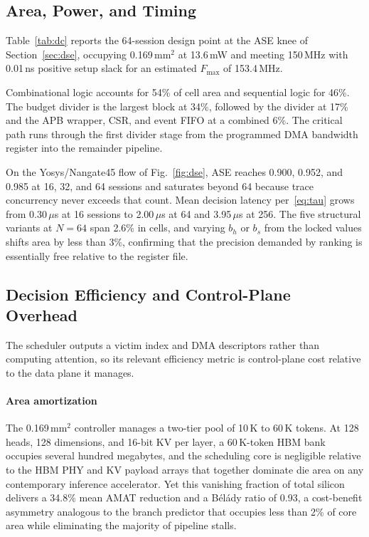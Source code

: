 \subsection{Area, Power, and Timing}
\label{sec:hw-ppa}

Table~\ref{tab:dc} reports the 64-session design point at the ASE knee
of Section~\ref{sec:dse}, occupying 0.169\,mm$^{2}$ at 13.6\,mW and
meeting 150\,MHz with 0.01\,ns positive setup slack for an estimated
$F_{\max}$ of 153.4\,MHz.



Combinational logic accounts for 54\% of cell area and sequential
logic for 46\%. The \tide budget divider is the largest block at 34\%,
followed by the \spear divider at 17\% and the APB wrapper, CSR, and
event FIFO at a combined 6\%. The critical path runs through the first
\tide divider stage from the programmed DMA bandwidth register into the
remainder pipeline.

On the Yosys/Nangate45 flow of Fig.~\ref{fig:dse}, ASE reaches 0.900,
0.952, and 0.985 at 16, 32, and 64 sessions and saturates beyond 64
because trace concurrency never exceeds that count. Mean decision
latency per~\eqref{eq:tau} grows from 0.30\,$\mu$s at 16 sessions to
2.00\,$\mu$s at 64 and 3.95\,$\mu$s at 256. The five structural
variants at $N{=}64$ span 2.6\% in cells, and varying $b_{h}$ or
$b_{s}$ from the locked values shifts area by less than 3\%,
confirming that the precision demanded by ranking is essentially free
relative to the register file.

\subsection{Decision Efficiency and Control-Plane Overhead}
\label{sec:hw-eff}

The scheduler outputs a victim index and DMA descriptors rather than
computing attention, so its relevant efficiency metric is control-plane
cost relative to the data plane it manages.

\paragraph{Area amortization}
The 0.169\,mm$^{2}$ controller manages a two-tier pool of 10\,K to
60\,K tokens. At 128 heads, 128 dimensions, and 16-bit KV per layer, a
60\,K-token HBM bank occupies several hundred megabytes, and the
scheduling core is negligible relative to the HBM PHY and KV payload
arrays that together dominate die area on any contemporary inference
accelerator. Yet this vanishing fraction of total silicon delivers a
34.8\% mean AMAT reduction and a B\'el\'ady ratio of 0.93, a
cost-benefit asymmetry analogous to the branch predictor that occupies
less than 2\% of core area while eliminating the majority of pipeline
stalls.

